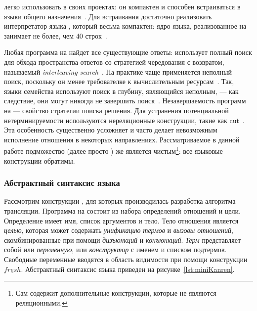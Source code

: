 \miniKanren{} легко использовать в своих проектах: он компактен и способен встраиваться в языки общего назначения~\cite{hemann2013ukanren, Kosarev2018TER}.
Для встраивания достаточно реализовать интерпретатор языка \miniKanren{}, который весьма компактен: ядро языка, реализованное на \scheme{} занимает не более, чем 40 строк~\cite{Friedman2005TRS, hemann2013ukanren}.

Любая программа на \miniKanren{} найдет все существующие ответы: \miniKanren{} использует полный поиск для обхода пространства ответов со стратегией чередования с возвратом, называемый \emph{interleaving search}~\cite{kiselyov2005bit}.
На практике чаще применяется неполный поиск, поскольку он менее требователке к вычислительным ресурсам~\cite{Hanus2012SSF}.
Так, языки семейства \prolog{} используют поиск в глубину, являющийся неполным, --- как следствие, они могут никогда не завершить поиск~\cite{Schreye1994TLP, Nerode1998LFA}.
Незавершаемость программ на \prolog{} --- свойство стратегии поиска решения.
Для устранения потенциальной нетерминируемости используются нереляционные конструкции, такие как cut~\cite{Lin1997ASC}.
Эта особенность существенно усложняет и часто делает невозможным исполнение отношения в некоторых направлениях.
Рассматриваемое в данной работе подможество \miniKanren{} (далее просто \miniKanren{}) же является чистым\footnote{Сам \miniKanren{} содержит дополнительные конструкции, которые не являются реляционными.}: все языковые конструкции обратимы.


\subsubsection{Абстрактный синтаксис языка \miniKanren{}}

Рассмотрим конструкции \miniKanren{}, для которых производилась разработка алгоритма трансляции.
Программа на \miniKanren{} состоит из набора определений отношений и цели.
Определение имеет имя, список аргументов и тело.
Тело отношения является \textit{целью}, которая может содержать \textit{унификацию термов} и \textit{вызовы отношений}, скомбинированные при помощи \textit{дизъюнкций} и \textit{конъюнкций}.
\textit{Терм} представляет собой или \textit{переменную}, или \textit{конструктор} с именем и списком подтермов.
Свободные переменные вводятся в область видимости при помощи конструкции $\underline{fresh}$.
Абстрактный синтаксис языка \miniKanren{} приведен на рисунке~\ref{lst:miniKanren}.

